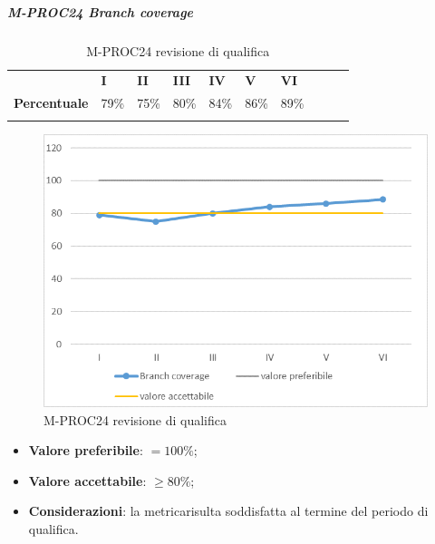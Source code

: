 \subparagraph{M-PROC24 Branch coverage} \mbox{}
\begin{longtable}[H!] {						
		>{}p{50mm}  		
		>{}p{8mm}
		>{}p{8mm}		
		>{}p{8mm}		
		>{}p{8mm}		
		>{}p{8mm}		
		>{}p{8mm}
		>{}p{8mm}
		>{}p{8mm}
		>{}p{8mm}
	}
	\rowcolor{gray!50}
	\textbf{} & \textbf{I} & \textbf{II} & \textbf{III} & \textbf{IV} & \textbf{V} & \textbf{VI} \TBstrut \\ [2mm]
	\textbf{Percentuale} & 79\% & 75\% & 80\% & 84\% & 86\% & 89\% \TBstrut \\ [2mm]
	\rowcolor{white}
	\caption{M-PROC24 revisione di qualifica}
\end{longtable}
\begin{figure}[H] 	
	\includegraphics[width=\linewidth]{./img/grafici/RQ24.png}	
	\caption{M-PROC24 revisione di qualifica}	
\end{figure}
\begin{itemize}
	\item \textbf{Valore preferibile}: $=100\%$;
	\item \textbf{Valore accettabile}: $\ge 80\%$;
	\item \textbf{Considerazioni}: la metrica\glosp risulta soddisfatta al termine del periodo di qualifica.
\end{itemize}

